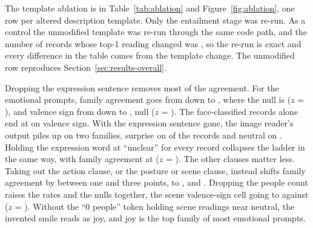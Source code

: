 The template ablation is in Table~\ref{tab:ablation} and Figure~\ref{fig:ablation}, one row per altered description template. Only the entailment stage was re-run. As a control the unmodified template was re-run through the same code path, and the number of records whose top-1 reading changed was \AblControlChanged{}, so the re-run is exact and every difference in the table comes from the template change. The unmodified row reproduces Section~\ref{sec:results-overall}.

Dropping the expression sentence removes most of the agreement. For the emotional prompts, family agreement goes from \FullEmoFamObs{} down to \AblDropExpressionEmoFamObs{}, where the null is \AblDropExpressionEmoFamNull{} ($z$ = \AblDropExpressionEmoFamZ{}), and valence sign from \FullEmoSignObs{} down to \AblDropExpressionEmoSignObs{}, null \AblDropExpressionEmoSignNull{} ($z$ = \AblDropExpressionEmoSignZ{}). The face-classified records alone end at \AblDropExpressionFaceSignObs{} on valence sign. With the expression sentence gone, the image reader's output piles up on two families, surprise on \AblDropExpressionSurprise{} of the \nAnalysed{} records and neutral on \AblDropExpressionNeutral{}. Holding the expression word at ``unclear'' for every record collapses the ladder in the same way, with family agreement at \AblFixedExpressionEmoFamObs{} ($z$ = \AblFixedExpressionEmoFamZ{}). The other clauses matter less. Taking out the action clause, or the posture or scene clause, instead shifts family agreement by between one and three points, to \AblDropActionEmoFamObs{}, \AblDropPostureEmoFamObs{} and \AblDropSceneEmoFamObs{}. Dropping the people count raises the rates and the nulls together, the scene valence-sign cell going to \AblDropPeopleSceneSignObs{} against \AblDropPeopleSceneSignNull{} ($z$ = \AblDropPeopleSceneSignZ{}). Without the ``0 people'' token holding scene readings near neutral, the invented smile reads as joy, and joy is the top family of most emotional prompts.


